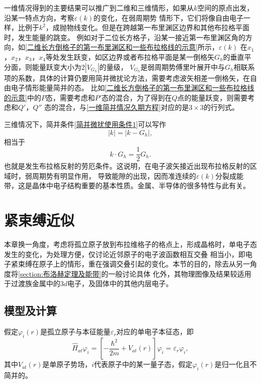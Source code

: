             一维情况得到的主要结果可以推广到二维和三维情形，如果从$k$空间的原点出发，沿某一特点方向，考察$\varepsilon(k)$的变化，在弱周期势
            情形下，它们将像自由电子一样，比例于$k^2$，成抛物线变化。但是在跨越第一布里渊区边界和其他布拉格平面时，发生能量的跳变。
            例如对于二位长方格子，沿某一接近第一布里渊区角的方向，如\autoref{二维长方倒格子的第一布里渊区和一些布拉格线的示意}所示，$\varepsilon(k)$
            在$x_1$，$x_2$，$x_3$，$x_4$等处发生跃变，如区边界或者布拉格平面是某一倒格矢$G_h$的垂直平分面，则能量跃变大小为$2|V_{G_h}|$的量级，
            $V_{G_h}$是弱周期势傅里叶展开中与$G_h$相联系项的系数，具体的计算仍要用简并微扰论方法，需要考虑波矢相差一倒格矢，在自由电子情形能量简并的态。
            比如\autoref{二维长方倒格子的第一布里渊区和一些布拉格线的示意}中的$P$态，需要考虑和$P'$态的混合，为了得到在$Q$点的能量跃变，则需要考虑和$Q'$，$Q''$
            态的混合，与\autoref{一维简并情况久期方程}对应的是$3\times3$的行列式。
            
            三维情况下，简并条件\autoref{简并微扰使用条件1}可以写作
            \begin{equation}
                |k|=|k-G_h|,
            \end{equation}
            相当于
            \begin{equation}
                k\cdot G_h=\frac{1}{2}G_h.
            \end{equation}
            也就是发生布拉格反射的劳厄条件。这说明，在电子波矢接近出现布拉格反射的区域时，弱周期势有明显作用，
            导致能隙的出现，因而准连续的$\varepsilon(k)$分裂成能带，这是晶体中电子结构重要的基本性质。金属、半导体的很多特性与此有关。

        \section{紧束缚近似}\label{section:紧束缚近似}
            
            本章换一角度，考虑将孤立原子放到布拉维格子的格点上，形成晶格时，单电子态发生的变化，为处理方便，仅讨论近邻原子的电子波函数相互交叠
            相当小，即电子紧束缚在原子上的情形，重在强调交叠引起的变化。本节的目的，除去从另一角度将\autoref{section:布洛赫定理及能带}的一般讨论具体
            化外，其物理图像及结果较适用于过渡族金属中的$3d$电子，及固体中的其他内层电子。

            \subsection{模型及计算}
                假定$\varphi_i(r)$是孤立原子与本征能量$\varepsilon_r$对应的单电子本征态，即
                \begin{equation}
                    \hat{H}_{at}\varphi_i=\left[ - \frac{\hbar^2}{2m} +V_{at}(r) \right]\varphi_i=\varepsilon_r\varphi_i,
                \end{equation}                
                其中$V_{at}(r)$是单原子势场，$i$代表原子中的某一量子态，假定$\varphi_i(r)$是归一化且不简并的。

